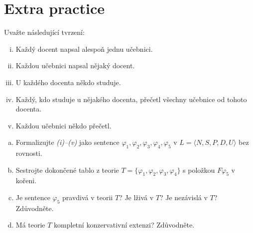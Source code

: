 \section*{Extra practice}


\begin{problem}
    
    Uvažte následující tvrzení:
    \begin{enumerate}[(i)]\it
        \item Každý docent napsal alespoň jednu učebnici.
        \item Každou učebnici napsal nějaký docent.
        \item U každého docenta někdo studuje.
        \item Každý, kdo studuje u nějakého docenta, přečetl všechny učebnice od tohoto docenta.
        \item Každou učebnici někdo přečetl.
    \end{enumerate}    
    \begin{enumerate}[(a)]
        \item Formalizujte {\it(i)--(v)} jako sentence $\varphi_1,\varphi_2,\varphi_3,\varphi_4,\varphi_5$ v $L=\langle N, S, P, D, U\rangle$ bez rovnosti.
        \item Sestrojte dokončené tablo z teorie $T=\{\varphi_1,\varphi_2,\varphi_3,\varphi_4\}$ s položkou $F\varphi_5$ v kořeni.
        \item Je sentence $\varphi_5$ pravdivá v teorii $T$? Je lživá v $T$? Je nezávislá v $T$? Zdůvodněte.
        \item Má teorie $T$ kompletní konzervativní extenzi? Zdůvodněte.
    \end{enumerate}

\end{problem}


